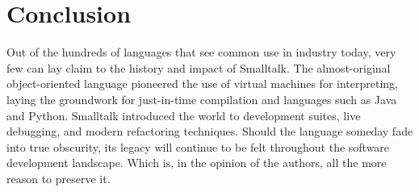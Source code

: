 \section{Conclusion}

Out of the hundreds of languages that see common use in industry
today, very few can lay claim to the history and impact of
Smalltalk. The almost-original object-oriented language pioneered the
use of virtual machines for interpreting, laying the groundwork for
just-in-time compilation and languages such as Java and
Python. Smalltalk introduced the world to development suites, live
debugging, and modern refactoring techniques. Should the language
someday fade into true obscurity, its legacy will continue to be felt
throughout the software development landscape. Which is, in the
opinion of the authors, all the more reason to preserve it.